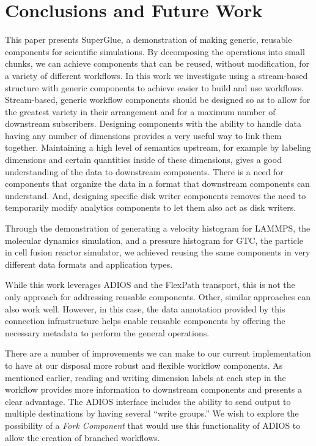 \documentclass[conference]{IEEEtran}
\begin{document}
\section{Conclusions and Future Work}
\label{s:conclusion}

This paper presents SuperGlue, a demonstration of making generic, reusable
components for scientific simulations. By decomposing the operations into small
chunks, we can achieve components that can be reused, without modification, for
a variety of different workflows. In this work we investigate using a
stream-based structure with generic components to achieve easier to build and
use workflows.  Stream-based, generic workflow components should be designed so
as to allow for the greatest variety in their arrangement and for a maximum
number of downstream subscribers. Designing components with the ability to
handle data having any number of dimensions provides a very useful way to link
them together. Maintaining a high level of semantics upstream, for example by
labeling dimensions and certain quantities inside of these dimensions, gives a
good understanding of the data to downstream components. There is a need for
components that organize the data in a format that downstream components can
understand. And, designing specific disk writer components removes the need to
temporarily modify analytics components to let them also act as disk writers.

Through the demonstration of generating a velocity histogram for LAMMPS, the
molecular dynamics simulation, and a pressure histogram for GTC, the particle
in cell fusion reactor simulator, we achieved reusing the same components in
very different data formats and application types.

While this work leverages ADIOS and the FlexPath transport, this is not the
only approach for addressing reusable components. Other, similar approaches can
also work well. However, in this case, the data annotation provided by this
connection infrastructure helps enable reusable components by offering the
necessary metadata to perform the general operations.

There are a number of improvements we can make to our current implementation to
have at our disposal more robust and flexible workflow components. As mentioned
earlier, reading and writing dimension labels at each step in the workflow
provides more information to downstream components and presents a clear
advantage. The ADIOS interface includes the ability to send output to multiple
destinations by having several ``write groups.'' We wish to explore the
possibility of a {\em Fork Component} that would use this functionality of
ADIOS to allow the creation of branched workflows.
\end{document}
